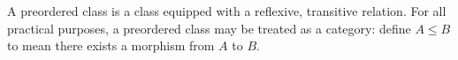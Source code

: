 A preordered class is a class equipped with a reflexive, transitive relation. For all practical purposes, a preordered class may be treated as a category: define $A \leqslant B$ to mean there exists a morphism from $A$ to $B$.
